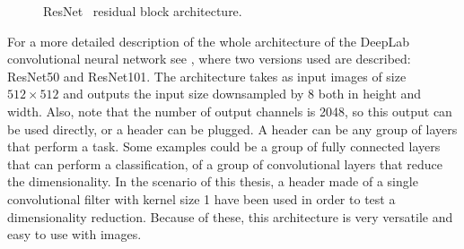 \begin{figure}[h]
  \centering
  \caption{ResNet~\resnet{} residual block architecture. }
  \label{fig:backbonearchitecture:resnetblock}
\end{figure}

For a more detailed description of the whole architecture of the DeepLab~\deeplab{} convolutional neural network see , where two versions used are described: ResNet50 and ResNet101.
The architecture takes as input images of size $512 \times 512$ and outputs the input size downsampled by $8$ both in height and width.
Also, note that the number of output channels is 2048, so this output can be used directly, or a header can be plugged.
A header can be any group of layers that perform a task. Some examples could be a group of fully connected layers that can perform a classification, of a group of convolutional layers that reduce the dimensionality.
In the scenario of this thesis, a header made of a single convolutional filter with kernel size 1 have been used in order to test a dimensionality reduction.
Because of these, this architecture is very versatile and easy to use with images.

